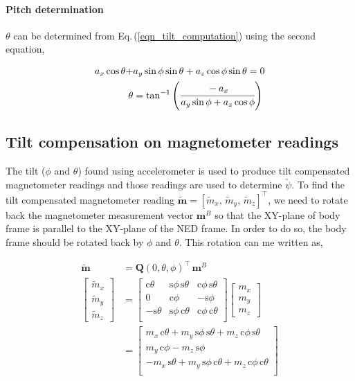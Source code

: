 \documentclass[12pt, a4paper]{article}
\begin{document}
\paragraph{Pitch determination}
$\theta$ can be determined from Eq.\,({\ref{eqn_tilt_computation}}) using the second equation,

\begin{equation}
\begin{split}
a_{x}\cos{\theta} + &a_{y}\sin{\phi}\sin{\theta} + a_{z}\cos{\phi}\sin{\theta} = 0\\
\theta &= \tan^{-1}{\left(\cfrac{-a_x}{a_y\sin{\phi} + a_z\cos{\phi}}\right)}
\end{split}
\end{equation}

\subsection{Tilt compensation on magnetometer readings}
The tilt ($\phi$ and $\theta$) found using accelerometer is used to produce tilt compensated magnetometer readings and those readings are used to determine $\tilde{\psi}$. To find the tilt compensated magnetometer reading $\tilde{\bm{m}} = [\tilde{m}_{x},\,\tilde{m}_{y},\,\tilde{m}_{z}]^{\intercal}$, we need to rotate back the magnetometer measurement vector $\bm{m}^{B}$ so that the XY-plane of body frame is parallel to the XY-plane of the NED frame. In order to do so, the body frame should be rotated back by $\phi$ and $\theta$. This rotation can me written as,

\begin{equation}
\begin{split}
\tilde{\bm{m}} &= \bm{Q}(0,\theta,\phi)^{\intercal}\,\bm{m}^{B} \\
\begin{bmatrix}
\tilde{m}_{x} \\ \tilde{m}_{y} \\ \tilde{m}_{z}
\end{bmatrix}
&=
\begin{bmatrix}
\text{c}\theta & \text{s}\phi\,\text{s}\theta &  \text{c}\phi\,\text{s}\theta \\
0 & \text{c}\phi & -\text{s}\phi \\
-\text{s}\theta& \text{s}\phi\,\text{c}\theta & \text{c}\phi\,\text{c}\theta \\
\end{bmatrix}
\begin{bmatrix}
 m_{x} \\ m_{y} \\ m_{z}
\end{bmatrix} \\
&=
\begin{bmatrix}
m_x\,\text{c}\theta + m_y\,\text{s}\phi\,\text{s}\theta +  m_z\,\text{c}\phi\,\text{s}\theta\\
m_y\,\text{c}\phi -m_z\,\text{s}\phi \\
-m_x\,\text{s}\theta + m_y\,\text{s}\phi\,\text{c}\theta + m_z\,\text{c}\phi\,\text{c}\theta \\
\end{bmatrix}
\end{split}
\end{equation} 
\end{document}
